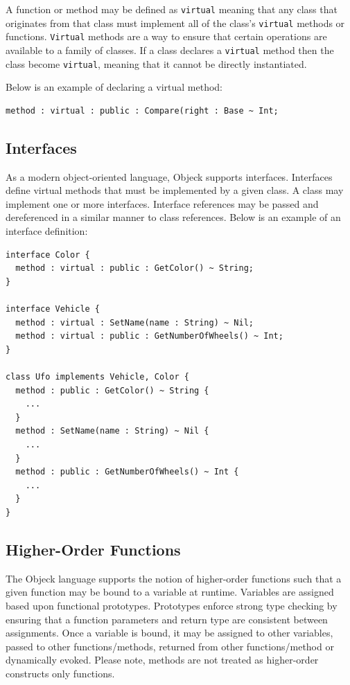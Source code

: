\documentclass[12pt]{article}
\begin{document}
A function or method may be defined as \texttt{virtual} meaning that
any class that originates from that class must implement all of the
class's \texttt{virtual} methods or functions.  \texttt{Virtual}
methods are a way to ensure that certain operations are available to a
family of classes. If a class declares a \texttt{virtual} method then
the class become \texttt{virtual}, meaning that it cannot be directly
instantiated.

Below is an example of declaring a virtual method:
\begin{verbatim}
method : virtual : public : Compare(right : Base ~ Int;
\end{verbatim}

\subsection{Interfaces}
As a modern object-oriented language, Objeck supports interfaces.
Interfaces define virtual methods that must be implemented by a given
class.  A class may implement one or more interfaces.  Interface
references may be passed and dereferenced in a similar manner to class
references.  Below is an example of an interface definition:

\begin{verbatim}
interface Color {
  method : virtual : public : GetColor() ~ String;
}

interface Vehicle {
  method : virtual : SetName(name : String) ~ Nil;
  method : virtual : public : GetNumberOfWheels() ~ Int;
}

class Ufo implements Vehicle, Color {
  method : public : GetColor() ~ String {
    ...
  }
  method : SetName(name : String) ~ Nil {
    ...
  }
  method : public : GetNumberOfWheels() ~ Int {
    ...
  }
}
\end{verbatim}

\subsection{Higher-Order Functions}
The Objeck language supports the notion of higher-order functions such
that a given function may be bound to a variable at runtime.
Variables are assigned based upon functional prototypes.  Prototypes
enforce strong type checking by ensuring that a function parameters
and return type are consistent between assignments.  Once a variable
is bound, it may be assigned to other variables, passed to other
functions/methods, returned from other functions/method or dynamically
evoked.  Please note, methods are not treated as higher-order
constructs only functions.
\end{document}
